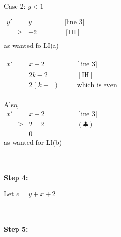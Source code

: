 \documentclass[12pt]{article}
\begin{document}
\begin{minipage}{\dimexpr\textwidth-10mm}
\begin{minipage}{\dimexpr\textwidth-10mm}
\begin{minipage}{\dimexpr\textwidth-10mm}
		\end{minipage}\\
		Case 2: $y < 1$

		\hfill\begin{minipage}{\dimexpr\textwidth-10mm}
			$\begin{array}{lcll}
					y' & =    & y \qquad \qquad & \text{[line 3]} \\
					   & \geq & -2              & [\text{IH}]     \\
				\end{array}$\\
			as wanted fo LI(a)
			\\\\
			$\begin{array}{lcll}
					x' & = & x-2 \qquad \qquad & \text{[line 3]}      \\
					   & = & 2k - 2            & [\text{IH}]          \\
					   & = & 2(k-1)            & \text{which is even}
				\end{array}$
			\\\\
			Also,\\
			$\begin{array}{lcll}
					x' & =    & x-2 \qquad \qquad & \text{[line 3]} \\
					   & \geq & 2 - 2             & (\clubsuit)     \\
					   & =    & 0                 &
				\end{array}$\\
			as wanted for LI(b)\\

		\end{minipage}
	\end{minipage}
\end{minipage}
\\\\\newpage
\noindent \textbf{Step 4:} %

\hfill\begin{minipage}{\dimexpr\textwidth-10mm}
	Let $e = y + x + 2$
\end{minipage}
\\\\
\textbf{Step 5:} %
\end{document}
